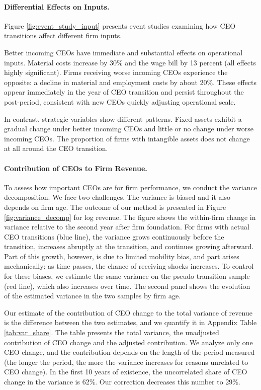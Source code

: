 \documentclass[11pt,a4paper]{article}
\begin{document}
\paragraph{Differential Effects on Inputs.} Figure \ref{fig:event_study_input} presents event studies examining how CEO transitions affect different firm inputs.

Better incoming CEOs have immediate and substantial effects on operational inputs. Material costs increase by 30\% and the wage bill by 13 percent (all effects highly significant). Firms receiving worse incoming CEOs experience the opposite: a decline in material and employment costs by about 20\%. These effects appear immediately in the year of CEO transition and persist throughout the post-period, consistent with new CEOs quickly adjusting operational scale.

In contrast, strategic variables show different patterns. Fixed assets exhibit a gradual change under better incoming CEOs and little or no change under worse incoming CEOs. The proportion of firms with intangible assets does not change at all around the CEO transition.

\paragraph{Contribution of CEOs to Firm Revenue.} To assess how important CEOs are for firm performance, we conduct the variance decomposition. We face two challenges. The variance is biased and it also depends on firm age. The outcome of our method is presented in Figure \ref{fig:variance_decomp} for log revenue. The figure shows the within-firm change in variance relative to the second year after firm foundation. For firms with actual CEO transitions (blue line), the variance grows continuously before the transition, increases abruptly at the transition, and continues growing afterward. Part of this growth, however, is due to limited mobility bias, and part arises mechanically: as time passes, the chance of receiving shocks increases. To control for these biases, we estimate the same variance on the pseudo transition sample (red line), which also increases over time. The second panel shows the evolution of the estimated variance in the two samples by firm age. 

Our estimate of the contribution of CEO change to the total variance of revenue is the difference between the two estimates, and we quantify it in Appendix Table \ref{tab:var_share}. The table presents the total variance, the unadjusted contribution of CEO change and the adjusted contribution. We analyze only one CEO change, and the contribution depends on the length of the period measured (the longer the period, the more the variance increases for reasons unrelated to CEO change). In the first 10 years of existence, the uncorrelated share of CEO change in the variance is 62\%. Our correction decreases this number to 29\%.
\end{document}
